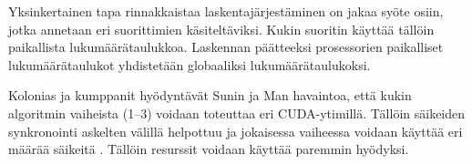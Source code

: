 \documentclass[a4paper,11pt]{article}
\begin{document}
Yksinkertainen tapa rinnakkaistaa laskentajärjestäminen on jakaa syöte osiin, jotka annetaan eri suorittimien käsiteltäviksi. Kukin suoritin käyttää tällöin paikallista lukumäärätaulukkoa. Laskennan päätteeksi prosessorien paikalliset lukumäärätaulukot yhdistetään globaaliksi lukumäärätaulukoksi.

Kolonias ja kumppanit hyödyntävät Sunin ja Man \cite{sun2009} havaintoa, että kukin algoritmin vaiheista (1--3) voidaan toteuttaa eri CUDA-ytimillä. Tällöin säikeiden synkronointi askelten välillä helpottuu ja jokaisessa vaiheessa voidaan käyttää eri määrää säikeitä \cite{kolonias2011}. Tällöin resurssit voidaan käyttää paremmin hyödyksi.



\printbibliography
\end{document}
